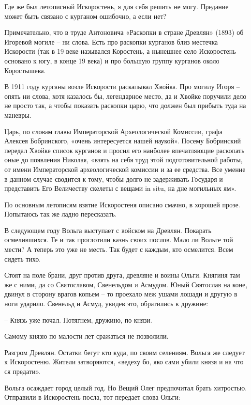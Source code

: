 Где же был летописный Искоростень, я для себя решить не могу. Предание может быть связано с курганом ошибочно, а если нет? 

Примечательно, что в труде Антоновича «Раскопки в стране Древлян» (1893) об Игоревой могиле – ни слова. Есть про раскопки курганов близ местечка Искорости (так в 19 веке назывался Коростень, а нынешнее село Искоростень основано к югу, в конце 19 века) и про большую группу курганов около Коростышева. 

В 1911 году курганы возле Искорости раскапывал Хвойка. Про могилу Игоря – опять ни слова, хотя казалось бы, легендарное место, да и Хвойке поручили дело не просто так, а чтобы показать раскопки царю, что должен был прибыть туда на маневры.

Царь, по словам главы Императорской Археологической Комиссии, графа Алексея Бобринского, «очень интересуется нашей наукой». Посему Бобринский передал Хвойке список курганов и просил его наиболее впечатляющие раскопать оные до появления Николая, «взять на себя труд этой подготовительной работы, от имени Императорской археологической комиссии и за ее средства. Все умение в данном случае сводится к тому, чтобы долго не задерживать Государя и представить Его Величеству скелеты с вещами in situ, на дне могильных ям». 

По основным летописям взятие Искоростеня описано смачно, в хорошей прозе. Попытаюсь так же ладно пересказать.

В следующем году Вольга выступает с войском на Древлян. Покарать осмелившихся. Те и так проглотили казнь своих послов. Мало ли Вольге той мести? А теперь это уже не месть. Так будет с каждым, кто осмелится. Всем сидеть тихо.

Стоят на поле брани, друг против друга, древляне и воины Ольги. Княгиня там же с ними, да со Святославом, Свенельдом и Асмудом. Юный Святослав на коне, двинул в сторону врагов копьем – то проехало меж ушами лошади и другую в ноги ударило. Свенельд и Асмуд, увидев это, обратились к дружине:

 – Князь уже почал. Потягнем, дружино, по князи.

Самому князю по малости лет сражаться не позволили.

Разгром Древлян. Остатки бегут кто куда, по своим селениям. Вольга же следует к Искоростеню. Жители затворяются, «ведеху бо, яко сами убили князя и на что ся предати».

Вольга осаждает город целый год. Но Вещий Олег предпочитал брать хитростью. Отправили в Искоростень посла, тот передает слова Ольги:

